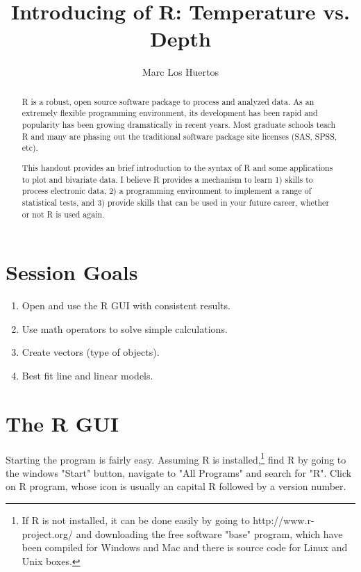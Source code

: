 \documentclass{tufte-handout}\usepackage[]{graphicx}\usepackage[]{xcolor}
\title{Introducing of R: Temperature vs. Depth %
}
\author[Marc Los Huertos]{Marc Los Huertos}
\date{}  %
\begin{document}
\maketitle%
\begin{abstract}
\noindent R is a robust, open source software package to process and analyzed data. As an extremely flexible programming environment, its development has been rapid and popularity has been growing dramatically in recent years. Most graduate schools teach R and many are phasing out the traditional software package site licenses (\eg SAS, SPSS, etc). 

This handout provides an brief introduction to the syntax of R and some applications to plot and bivariate data. I believe R provides a mechanism to learn 1) skills to process electronic data, 2) a programming environment to implement a range of statistical tests, and 3) provide skills that can be used in your future career, whether or not R is used again.
\end{abstract}



\section{Session Goals}

\begin{enumerate}
	\item Open and use the R GUI with consistent results.
	\item Use math operators to solve simple calculations.
	\item Create vectors (type of objects).
	\item Best fit line and linear models.
\end{enumerate}

\section{The R GUI}

Starting the program is fairly easy. Assuming R is installed,\footnote[][.03in]{If R is not installed, it can be done easily by going to http://www.r-project.org/ and downloading the free software "base" program, which have been compiled for Windows and Mac and there is source code for Linux and Unix boxes.} find R by going to the windows "Start" button, navigate to "All Programs" and search for "R". Click on R program, whose icon is usually an capital R followed by a version number. 
\end{document}
